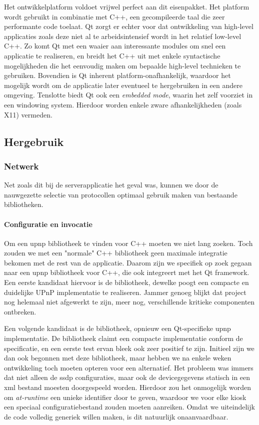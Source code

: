 Het ontwikkelplatform  voldoet vrijwel perfect aan dit eisenpakket. Het platform wordt gebruikt in combinatie met C++, een gecompileerde taal die zeer performante code toelaat. Qt zorgt er echter voor dat ontwikkeling van high-level applicaties zoals deze niet al te arbeidsintensief wordt in het relatief low-level C++. Zo komt Qt met een waaier aan interessante modules om snel een applicatie te realiseren, en breidt het C++ uit met enkele syntactische mogelijkheden die het eenvoudig maken om bepaalde high-level technieken te gebruiken. Bovendien is Qt inherent platform-onafhankelijk, waardoor het mogelijk wordt om de applicatie later eventueel te hergebruiken in een andere omgeving. Tenslotte biedt Qt ook een \emph{embedded mode}, waarin het zelf voorziet in een windowing system. Hierdoor worden enkele zware afhankelijkheden (zoals X11) vermeden.

\subsection{Hergebruik}

\subsubsection{Netwerk}

Net zoals dit bij de serverapplicatie het geval was, kunnen we door de nauwgezette selectie van protocollen optimaal gebruik maken van bestaande bibliotheken.

\paragraph{Configuratie en invocatie} Om een \ac{upnp} bibliotheek te vinden voor C++ moeten we niet lang zoeken. Toch zouden we met een "normale" C++ bibliotheek geen maximale integratie bekomen met de rest van de applicatie. Daarom zijn we specifiek op zoek gegaan naar een \ac{upnp} bibliotheek voor C++, die ook integreert met het Qt framework. Een eerste kandidaat hiervoor is de  bibliotheek, dewelke poogt een compacte en duidelijke UPnP implementatie te realiseren. Jammer genoeg blijkt dat project nog helemaal niet afgewerkt te zijn, meer nog, verschillende kritieke componenten ontbreken.

Een volgende kandidaat is de  bibliotheek, opnieuw een Qt-specifieke \ac{upnp} implementatie. De bibliotheek claimt een compacte implementatie conform de specificatie, en een eerste test ervan bleek ook zeer positief te zijn. Initieel zijn we dan ook begonnen met deze bibliotheek, maar hebben we na enkele weken ontwikkeling toch moeten opteren voor een alternatief. Het probleem was immers dat niet alleen de \ac{ssdp} configuraties, maar ook de devicegegevens statisch in een \ac{xml} bestand moesten doorgespeeld worden. Hierdoor zou het onmogelijk worden om \emph{at-runtime} een unieke identifier door te geven, waardoor we voor elke kiosk een speciaal configuratiebestand zouden moeten aanreiken. Omdat we uiteindelijk de code volledig generiek willen maken, is dit natuurlijk onaanvaardbaar.

